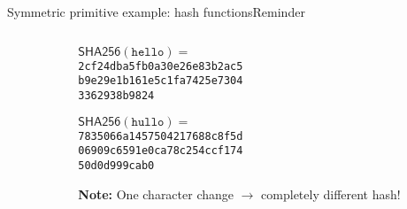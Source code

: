 \documentclass[aspectratio=169, lualatex, handout]{beamer}
\begin{document}
\begin{frame}{Symmetric primitive example: hash functions}{Reminder}
	\begin{columns}[c]
		\begin{column}{0.55\textwidth}
		\end{column}
		\begin{column}{0.45\textwidth}
			\begin{tcolorbox}
				[colback=black!5!white,colframe=ciphergray] $\mathsf{SHA256}(\texttt{hello}) =$ \\ \texttt{2cf24dba5fb0a30e26e83b2ac5}\\ \texttt{b9e29e1b161e5c1fa7425e7304}\\
				\texttt{3362938b9824}

				$\mathsf{SHA256}(\texttt{hullo}) =$ \\ \texttt{7835066a1457504217688c8f5d}\\
				\texttt{06909c6591e0ca78c254ccf174}\\ \texttt{50d0d999cab0}
			\end{tcolorbox}
			\textcolor{cipherprimary}{\textbf{Note:} \small One character change $\rightarrow$
				completely different hash!}
		\end{column}
	\end{columns}
\end{frame}
\end{document}
